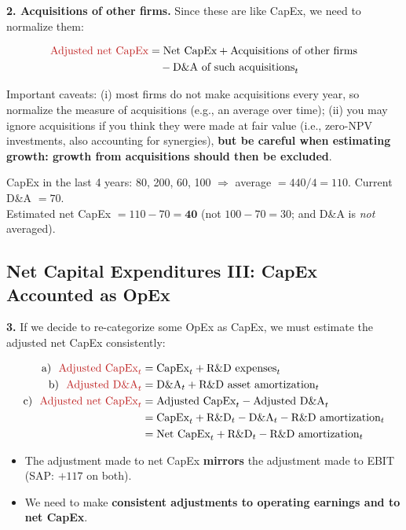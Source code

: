 \textbf{2. Acquisitions of other firms.} Since these are like CapEx, we need to normalize them:
\begin{keybox}
\begin{align*}
\textcolor{keyred}{\text{Adjusted net CapEx}} &= \text{Net CapEx} + \text{Acquisitions of other firms}\\
&\quad - \text{D\&A of such acquisitions}_t
\end{align*}
\end{keybox}
Important caveats: (i) most firms do not make acquisitions every year, so normalize the measure of acquisitions (e.g., an average over time); (ii) you may ignore acquisitions if you think they were made at fair value (i.e., zero-NPV investments, also accounting for synergies), \textbf{but be careful when estimating growth: growth from acquisitions should then be excluded}.

\begin{exbox}
CapEx in the last 4 years: 80, 200, 60, 100 $\Rightarrow$ average $=440/4=110$. Current D\&A $=70$.\\
Estimated net CapEx $=110-70=\mathbf{40}$ (not $100-70=30$; and D\&A is \emph{not} averaged).
\end{exbox}

\subsection{Net Capital Expenditures III: CapEx Accounted as OpEx}

\textbf{3.} If we decide to re-categorize some OpEx as CapEx, we must estimate the adjusted net CapEx consistently:
\begin{keybox}
\begin{align*}
\text{a) }\ \textcolor{keyred}{\text{Adjusted CapEx}_t} &= \text{CapEx}_t + \text{R\&D expenses}_t\\
\text{b) }\ \textcolor{keyred}{\text{Adjusted D\&A}_t} &= \text{D\&A}_t + \text{R\&D asset amortization}_t\\
\text{c) }\ \textcolor{keyred}{\text{Adjusted net CapEx}_t} &= \text{Adjusted CapEx}_t - \text{Adjusted D\&A}_t\\
&= \text{CapEx}_t + \text{R\&D}_t - \text{D\&A}_t - \text{R\&D amortization}_t\\
&= \text{Net CapEx}_t + \text{R\&D}_t - \text{R\&D amortization}_t
\end{align*}
\end{keybox}
\begin{itemize}
  \item The adjustment made to net CapEx \textbf{mirrors} the adjustment made to EBIT (SAP: $+117$ on both).
  \item We need to make \textbf{consistent adjustments to operating earnings and to net CapEx}.
\end{itemize}

